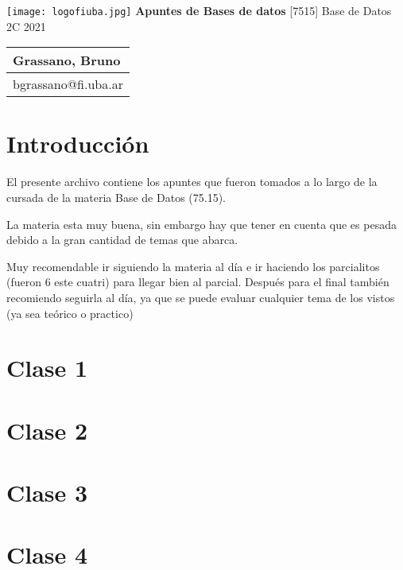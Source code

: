 \documentclass[titlepage,a4paper]{article}
\begin{document}
\begin{titlepage} %
	\hfill\texttt{[image: logofiuba.jpg]}
    \centering
    \vfill
    \Huge \textbf{Apuntes de Bases de datos}
    \vskip2cm
    \Large [7515] Base de Datos\\
    2C 2021
    \vfill
    \begin{tabular}{ | l | } %
      \hline
      Grassano, Bruno \\ \hline
      bgrassano@fi.uba.ar \\ \hline
  	\end{tabular}
    \vfill
    \vfill
\end{titlepage}

\tableofcontents %

\newpage

\section*{Introducción}\label{sec:intro}
El presente archivo contiene los apuntes que fueron tomados a lo largo de la cursada de la materia Base de Datos (75.15).

La materia esta muy buena, sin embargo hay que tener en cuenta que es pesada debido a la gran cantidad de temas que abarca. 

Muy recomendable ir siguiendo la materia al día e ir haciendo los parcialitos (fueron 6 este cuatri) para llegar bien al parcial. Después para el final también recomiendo seguirla al día, ya que se puede evaluar cualquier tema de los vistos (ya sea teórico o practico)

\newpage
\section*{Clase 1}


\section*{Clase 2}


\section*{Clase 3}


\section*{Clase 4}

\end{document}
